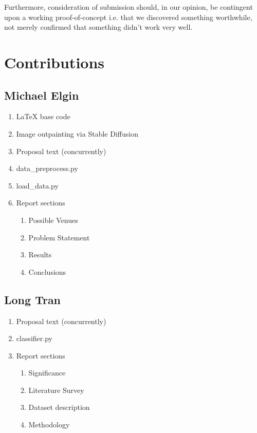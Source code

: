 \documentclass[conference]{IEEEtran}
\begin{document}
Furthermore, consideration of submission should, in our opinion, be contingent upon a working proof-of-concept i.e. that we discovered something worthwhile, not merely confirmed that something didn't work very well.

\section{Contributions}

\subsection{Michael Elgin}
\begin{enumerate}
    \item LaTeX base code
    \item Image outpainting via Stable Diffusion
    \item Proposal text (concurrently)
    \item data\_preprocess.py
    \item load\_data.py
    \item Report sections
    \begin{enumerate}
        \item Possible Venues
        \item Problem Statement
        \item Results
        \item Conclusions
    \end{enumerate}
\end{enumerate}

\subsection{Long Tran}
\begin{enumerate}
    \item Proposal text (concurrently)
    \item classifier.py
    \item Report sections
    \begin{enumerate}
        \item Significance
        \item Literature Survey
        \item Dataset description
        \item Methodology
    \end{enumerate}
\end{enumerate}

\printbibliography
\end{document}
